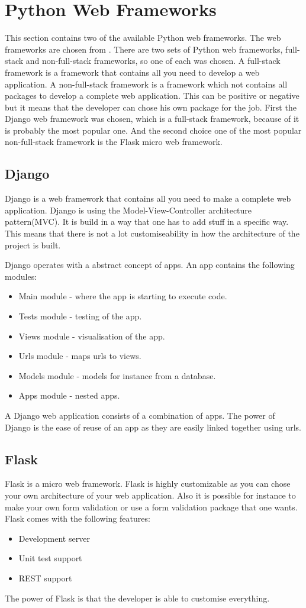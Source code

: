 \section{Python Web Frameworks}
This section contains two of the available Python web frameworks.
The web frameworks are chosen from \citet{python_web_frameworks_list}.
There are two sets of Python web frameworks, full-stack and non-full-stack frameworks, so one of each was chosen.
A full-stack framework is a framework that contains all you need to develop a web application.
A non-full-stack framework is a framework which not contains all packages to develop a complete web application.
This can be positive or negative but it means that the developer can chose his own package for the job.
First the Django web framework was chosen, which is a full-stack framework, because of it is probably the most popular one.
And the second choice one of the most popular non-full-stack framework is the Flask micro web framework.

\subsection{Django}
Django\cite{django_cite} is a web framework that contains all you need to make a complete web application.
Django is using the Model-View-Controller architecture pattern(MVC)\cite{leff2001web}.
It is build in a way that one has to add stuff in a specific way.
This means that there is not a lot customiseability in how the architecture of the project is built.

Django operates with a abstract concept of apps.
An app contains the following modules:
\begin{itemize}
\item Main module - where the app is starting to execute code.
\item Tests module - testing of the app.
\item Views module - visualisation of the app.
\item Urls module - maps urls to views.
\item Models module - models for instance from a database.
\item Apps module - nested apps.
\end{itemize}
A Django web application consists of a combination of apps.
The power of Django is the ease of reuse of an app as they are easily linked together using urls.

\subsection{Flask}
Flask\cite{flask_official} is a micro web framework.
Flask is highly customizable as you can chose your own architecture of your web application.
Also it is possible for instance to make your own form validation or use a form validation package that one wants.
Flask comes with the following features:
\begin{itemize}
\item Development server
\item Unit test support
\item REST support
\end{itemize}
The power of Flask is that the developer is able to customise everything.
